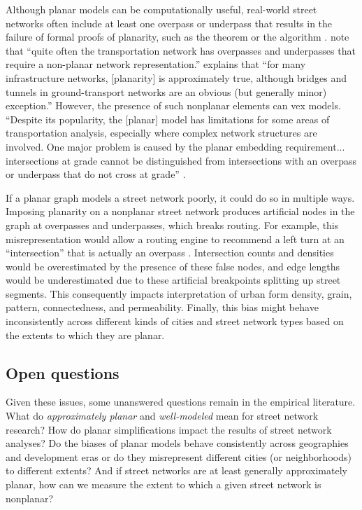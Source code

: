 \documentclass[Afour,sageh,times]{sagej}
\begin{document}
Although planar models can be computationally useful, real-world street networks often include at least one overpass or underpass that results in the failure of formal proofs of planarity, such as the \citet{kuratowski_sur_1930} theorem or the \cite{hopcroft_efficient_1974} algorithm \citep[cf.][]{gastner_spatial_2006,levinson_network_2012}. \citet[p.~199]{jiang_object-oriented_2010} note that \enquote{quite often the transportation network has overpasses and underpasses that require a non-planar network representation.} \citet[p.~1258]{fischer_spatial_2014} explains that \enquote{for many infrastructure networks, {[planarity]} is approximately true, although bridges and tunnels in ground-transport networks are an obvious (but generally minor) exception.} However, the presence of such nonplanar elements can vex models. \enquote{Despite its popularity, the [planar] model has limitations for some areas of transportation analysis, especially where complex network structures are involved. One major problem is caused by the planar embedding requirement... intersections at grade cannot be distinguished from intersections with an overpass or underpass that do not cross at grade} \citep[p.~395]{fischer_gis_2004}.

If a planar graph models a street network poorly, it could do so in multiple ways. Imposing planarity on a nonplanar street network produces artificial nodes in the graph at overpasses and underpasses, which breaks routing. For example, this misrepresentation would allow a routing engine to recommend a left turn at an \enquote{intersection} that is actually an overpass \citep[p.~6]{kwan_review_1996}. Intersection counts and densities would be overestimated by the presence of these false nodes, and edge lengths would be underestimated due to these artificial breakpoints splitting up street segments. This consequently impacts interpretation of urban form density, grain, pattern, connectedness, and permeability. Finally, this bias might behave inconsistently across different kinds of cities and street network types based on the extents to which they are planar.

\subsection{Open questions}

Given these issues, some unanswered questions remain in the empirical literature. What do \emph{approximately planar} and \emph{well-modeled} mean for street network research? How do planar simplifications impact the results of street network analyses? Do the biases of planar models behave consistently across geographies and development eras or do they misrepresent different cities (or neighborhoods) to different extents? And if street networks are at least generally approximately planar, how can we measure the extent to which a given street network is nonplanar?
\end{document}
